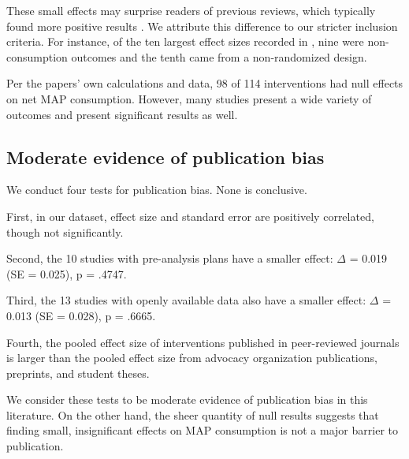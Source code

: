 \documentclass[sn-nature,referee,pdflatex]{sn-jnl}
\begin{document}
These small effects may surprise readers of previous reviews, which
typically found more positive results
\citep{mathur2021meta, meier2022, mertens2022}. We attribute this
difference to our stricter inclusion criteria. For instance, of the ten
largest effect sizes recorded in \citep{mathur2021effectiveness}, nine
were non-consumption outcomes and the tenth came from a non-randomized
design.

Per the papers' own calculations and data, 98 of 114 interventions had
null effects on net MAP consumption. However, many studies present a
wide variety of outcomes and present significant results as well.

\begin{comment}
Could put this back in: "Using our calculations of effect size and standard error 15 interventions have 95%
\end{comment}

\subsection{Moderate evidence of publication bias}\label{sec2.2}

We conduct four tests for publication bias. None is conclusive.

\begin{comment} 
Could put in introductory remarks about how this puts our main results in one light or another? 
\end{comment}

First, in our dataset, effect size and standard error are positively
correlated, though not significantly.

Second, the 10 studies with pre-analysis plans have a smaller effect:
\(\Delta\) = 0.019 (SE = 0.025), p = .4747.

Third, the 13 studies with openly available data also have a smaller
effect: \(\Delta\) = 0.013 (SE = 0.028), p = .6665.

Fourth, the pooled effect size of interventions published in
peer-reviewed journals is larger than the pooled effect size from
advocacy organization publications, preprints, and student theses.

We consider these tests to be moderate evidence of publication bias in
this literature. On the other hand, the sheer quantity of null results
suggests that finding small, insignificant effects on MAP consumption is
not a major barrier to publication.
\end{document}
